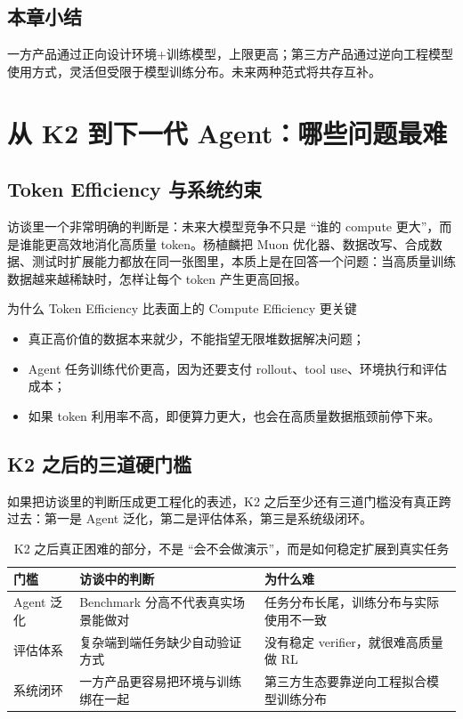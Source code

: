 \documentclass[a4paper]{article}
\begin{document}
\subsection{本章小结}

一方产品通过正向设计环境+训练模型，上限更高；第三方产品通过逆向工程模型使用方式，灵活但受限于模型训练分布。未来两种范式将共存互补。


\section{从 K2 到下一代 Agent：哪些问题最难}

\subsection{Token Efficiency 与系统约束}
访谈里一个非常明确的判断是：未来大模型竞争不只是 ``谁的 compute 更大''，而是谁能更高效地消化高质量 token。杨植麟把 Muon 优化器、数据改写、合成数据、测试时扩展能力都放在同一张图里，本质上是在回答一个问题：当高质量训练数据越来越稀缺时，怎样让每个 token 产生更高回报。

\begin{importantbox}{为什么 Token Efficiency 比表面上的 Compute Efficiency 更关键}
\begin{itemize}
    \item 真正高价值的数据本来就少，不能指望无限堆数据解决问题；
    \item Agent 任务训练代价更高，因为还要支付 rollout、tool use、环境执行和评估成本；
    \item 如果 token 利用率不高，即便算力更大，也会在高质量数据瓶颈前停下来。
\end{itemize}
\end{importantbox}

\subsection{K2 之后的三道硬门槛}
如果把访谈里的判断压成更工程化的表述，K2 之后至少还有三道门槛没有真正跨过去：第一是 Agent 泛化，第二是评估体系，第三是系统级闭环。

\begin{table}[H]
\centering
\begin{tabular}{p{2.8cm}p{4.2cm}p{4.5cm}}
\toprule
\textbf{门槛} & \textbf{访谈中的判断} & \textbf{为什么难} \\
\midrule
Agent 泛化 & Benchmark 分高不代表真实场景能做对 & 任务分布长尾，训练分布与实际使用不一致 \\
评估体系 & 复杂端到端任务缺少自动验证方式 & 没有稳定 verifier，就很难高质量做 RL \\
系统闭环 & 一方产品更容易把环境与训练绑在一起 & 第三方生态要靠逆向工程拟合模型训练分布 \\
\bottomrule
\end{tabular}
\caption{K2 之后真正困难的部分，不是 ``会不会做演示''，而是如何稳定扩展到真实任务}
\end{table}
\end{document}
